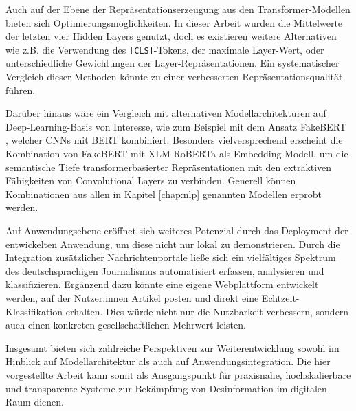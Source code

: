 Auch auf der Ebene der Repräsentationserzeugung aus den Transformer-Modellen bieten sich Optimierungsmöglichkeiten. 
In dieser Arbeit wurden die Mittelwerte der letzten vier Hidden Layers genutzt, doch es existieren weitere Alternativen wie z.B. die Verwendung des 
\texttt{[CLS]}-Tokens, der maximale Layer-Wert, oder unterschiedliche Gewichtungen der Layer-Repräsentationen. 
Ein systematischer Vergleich dieser Methoden könnte zu einer verbesserten Repräsentationsqualität führen.

Darüber hinaus wäre ein Vergleich mit alternativen Modellarchitekturen auf Deep-Learning-Basis von Interesse, wie zum Beispiel mit dem Ansatz FakeBERT \cite{Kaliyar:2021aa}, 
welcher CNNs mit BERT kombiniert. Besonders vielversprechend erscheint die Kombination von FakeBERT mit XLM-RoBERTa als Embedding-Modell,
um die semantische Tiefe transformerbasierter Repräsentationen mit den extraktiven Fähigkeiten von Convolutional Layers zu verbinden.
Generell können Kombinationen aus allen in Kapitel \ref{chap:nlp} genannten Modellen erprobt werden.

Auf Anwendungsebene eröffnet sich weiteres Potenzial durch das Deployment der entwickelten Anwendung, um diese nicht nur lokal zu demonstrieren.
Durch die Integration zusätzlicher Nachrichtenportale ließe sich ein vielfältiges Spektrum des deutschsprachigen Journalismus automatisiert erfassen, 
analysieren und klassifizieren.
Ergänzend dazu könnte eine eigene Webplattform entwickelt werden, auf der Nutzer:innen Artikel posten und direkt eine Echtzeit-Klassifikation 
erhalten. Dies würde nicht nur die Nutzbarkeit verbessern, sondern auch einen konkreten gesellschaftlichen Mehrwert leisten.

Insgesamt bieten sich zahlreiche Perspektiven zur Weiterentwicklung sowohl im Hinblick auf Modellarchitektur als auch auf Anwendungsintegration. 
Die hier vorgestellte Arbeit kann somit als Ausgangspunkt für praxisnahe, hochskalierbare und transparente Systeme zur Bekämpfung von Desinformation 
im digitalen Raum dienen.


